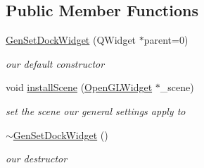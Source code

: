 \subsection*{Public Member Functions}
\begin{DoxyCompactItemize}
\item 
\hypertarget{class_gen_set_dock_widget_a438953fb1560e6b04895023cdc805e00}{\hyperlink{class_gen_set_dock_widget_a438953fb1560e6b04895023cdc805e00}{Gen\-Set\-Dock\-Widget} (Q\-Widget $\ast$parent=0)}\label{class_gen_set_dock_widget_a438953fb1560e6b04895023cdc805e00}

\begin{DoxyCompactList}\small\item\em our default constructor \end{DoxyCompactList}\item 
\hypertarget{class_gen_set_dock_widget_a999341b74bebe79f7e1b95e5f0aa1f6c}{void \hyperlink{class_gen_set_dock_widget_a999341b74bebe79f7e1b95e5f0aa1f6c}{install\-Scene} (\hyperlink{class_open_g_l_widget}{Open\-G\-L\-Widget} $\ast$\-\_\-scene)}\label{class_gen_set_dock_widget_a999341b74bebe79f7e1b95e5f0aa1f6c}

\begin{DoxyCompactList}\small\item\em set the scene our general settings apply to \end{DoxyCompactList}\item 
\hypertarget{class_gen_set_dock_widget_a5062abcc91b59ac636cf369ace58c25c}{\hyperlink{class_gen_set_dock_widget_a5062abcc91b59ac636cf369ace58c25c}{$\sim$\-Gen\-Set\-Dock\-Widget} ()}\label{class_gen_set_dock_widget_a5062abcc91b59ac636cf369ace58c25c}

\begin{DoxyCompactList}\small\item\em our destructor \end{DoxyCompactList}\end{DoxyCompactItemize}
